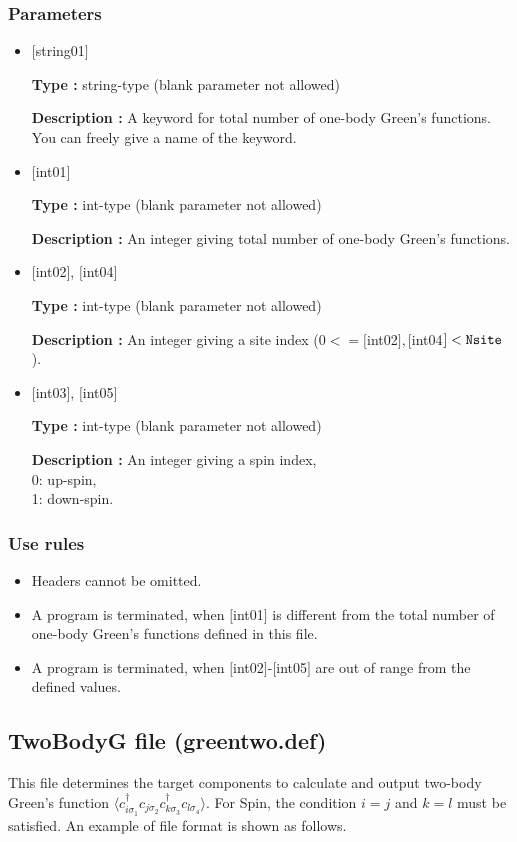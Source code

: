 \subsubsection{Parameters}
 \begin{itemize}

    \item  $[$string01$]$
   
    {\bf Type :} string-type (blank parameter not allowed)

   {\bf Description :} A keyword for total number of one-body Green's functions. You can freely give a name of the keyword.

   \item  $[$int01$]$
   
    {\bf Type :} int-type (blank parameter not allowed)

   {\bf Description :}  An integer giving total number of one-body Green's functions.

  \item  $[$int02$]$, $[$int04$]$

 {\bf Type :} int-type (blank parameter not allowed)

{\bf Description :} An integer giving a site index ($0<= [$int02$], [$int04$]<\verb|Nsite|$).
 
  \item  $[$int03$]$, $[$int05$]$

 {\bf Type :} int-type (blank parameter not allowed)

{\bf Description :} 
An integer giving a spin index,\\
0: up-spin,\\
1: down-spin.

\end{itemize}

\subsubsection{Use rules}
\begin{itemize}
\item Headers cannot be omitted. 
\item A program is terminated, when $[$int01$]$ is different from the total number of one-body Green's functions defined in this file.
\item A program is terminated, when $[$int02$]$-$[$int05$]$ are out of range from the defined values.
\end{itemize}

\newpage
\subsection{TwoBodyG file (greentwo.def)}
\label{Subsec:twobodyg}
This file determines the target components to calculate and output two-body Green's function $\langle c_{i\sigma_1}^{\dagger}c_{j\sigma_2}c_{k\sigma_3}^{\dagger}c_{l\sigma_4}\rangle$. {For Spin, the condition $i=j$ and $k=l$ must be satisfied.}
An example of file format is shown as follows.

